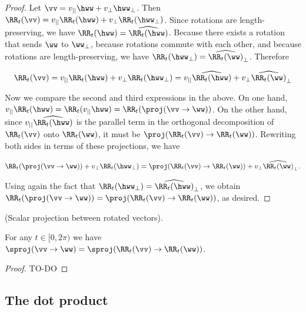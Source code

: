 \begin{proof}
    Let $\vv = v_{||} \hww + v_\perp \hww_\perp$. Then $\RR_t(\vv) = v_{||} \RR_t(\hww) + v_\perp \RR_t(\hww_\perp)$. Since rotations are length-preserving, we have $\RR_t(\hww) = \widehat{\RR_t(\hww)}$. Because there exists a rotation that sends $\ww$ to $\ww_\perp$, because rotations commute with each other, and because rotations are length-preserving, we have $\RR_t(\hww_\perp) = \widehat{\RR_t(\ww)}_\perp$. Therefore

    \begin{align*}
        \RR_t(\vv) = v_{||} \RR_t(\hww) + v_\perp \RR_t(\hww_\perp) = v_{||} \widehat{\RR_t(\hww)} + v_\perp \widehat{\RR_t(\ww)}_\perp
    \end{align*}

    Now we compare the second and third expressions in the above. On one hand, $v_{||} \RR_t(\hww) = \RR_t(v_{||} \hww) = \RR_t(\proj(\vv \rightarrow \ww))$. On the other hand, since $v_{||}\widehat{\RR_t(\hww)}$ is the parallel term in the orthogonal decomposition of $\RR_t(\vv)$ onto $\RR_t(\ww)$, it must be $\proj(\RR_t(\vv) \rightarrow \RR_t(\ww))$. Rewriting both sides in terms of these projections, we have

    \begin{align*}
        \RR_t(\proj(\vv \rightarrow \ww)) + v_\perp \RR_t(\hww_\perp) = \proj(\RR_t(\vv) \rightarrow \RR_t(\ww)) + v_\perp \widehat{\RR_t(\ww)}_\perp.
    \end{align*}

    Using again the fact that $\RR_t(\hww_\perp) = \widehat{\RR_t(\hww)}_\perp$, we obtain $\RR_t(\proj(\vv \rightarrow \ww)) = \proj(\RR_t(\vv) \rightarrow \RR_t(\ww))$, as desired. 
\end{proof}

\begin{lemma}
	(Scalar projection between rotated vectors).
	
	For any $t \in [0, 2\pi)$ we have $\sproj(\vv \rightarrow \ww) = \sproj(\RR_t(\vv) \rightarrow \RR_t(\ww))$.
\end{lemma}

\begin{proof}
	TO-DO
\end{proof}

\newpage

\subsection*{The dot product}

